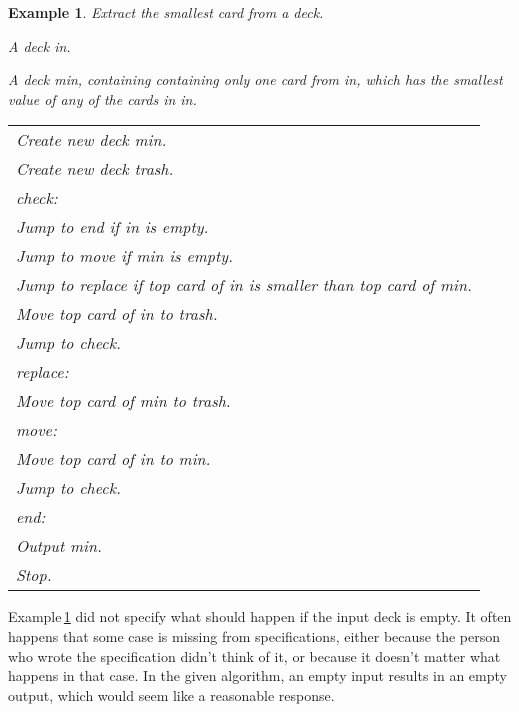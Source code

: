 \documentclass[a4paper,twoside]{tufte-handout}
\newtheorem{example}{Example}
\newcommand\lbl[1]{\hspace{-1em}\emph{#1:}}
\begin{document}
\begin{example}\label{extractsmallest}
  Extract the smallest card from a deck.
  \begin{description}
  \item[Input:] A deck \emph{in}.
  \item[Output:] A deck \emph{min}, containing containing only one
    card from \emph{in}, which has the smallest value of any of the
    cards in \emph{in}.
 \item[Algorithm:]
  \item\normalfont
    \begin{tabular}{l}
      Create new deck \emph{min}.\\
      Create new deck \emph{trash}.\\
      \lbl{check}\\
      Jump to \emph{end} if \emph{in} is empty.\\
      Jump to \emph{move} if \emph{min} is empty.\\
      Jump to \emph{replace} if top card of \emph{in} is smaller than
      top card of \emph{min}.\\
      Move top card of \emph{in} to \emph{trash}.\\
      Jump to \emph{check}.\\
      \lbl{replace}\\
      Move top card of \emph{min} to \emph{trash}.\\
      \lbl{move}\\
      Move top card of \emph{in} to \emph{min}.\\
      Jump to \emph{check}.\\
      \lbl{end}\\
      Output \emph{min}.\\
      Stop.
    \end{tabular}
  \end{description}
\end{example}

Example\,\ref{extractsmallest} did not specify what should happen if
the input deck is empty. It often happens that some case is missing
from specifications, either because the person who wrote the
specification didn't think of it, or because it doesn't matter what
happens in that case. In the given algorithm, an empty input results
in an empty output, which would seem like a reasonable response.

\enlargethispage{2\baselineskip}
\end{document}
